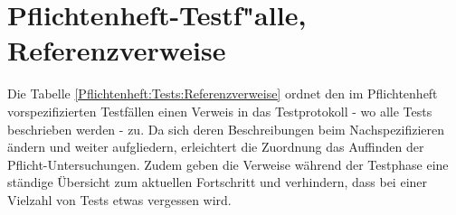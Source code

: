 %



\newpage



\section{Pflichtenheft-Testf{"a}lle, Referenzverweise}
\label{Abschnitt:Tests:Protokoll:Pflichtenheft-Verweise}

Die Tabelle \ref{Pflichtenheft:Tests:Referenzverweise} ordnet den im Pflichtenheft vorspezifizierten Testfällen einen Verweis in das Testprotokoll - wo alle Tests beschrieben werden - zu. Da sich deren Beschreibungen beim Nachspezifizieren ändern und weiter aufgliedern, erleichtert die Zuordnung das Auffinden der Pflicht-Untersuchungen. Zudem geben die Verweise während der Testphase eine ständige Übersicht zum aktuellen Fortschritt und verhindern, dass bei einer Vielzahl von Tests etwas vergessen wird.

~\\

 


